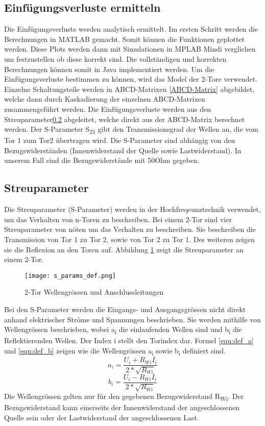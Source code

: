 \subsection{Einfügungsverluste ermitteln} \label{subsec:vorgehen}
Die Einfügungsverluste werden analytisch ermittelt. Im ersten Schritt werden die Berechnungen in MATLAB gemacht. Somit können die Funktionen  geplottet werden. Diese Plots werden dann mit Simulationen in MPLAB Mindi verglichen um festzustellen ob diese korrekt sind. Die vollständigen und korrekten Berechnungen können somit in Java implementiert werden. Um die Einfügungsverluste bestimmen zu können, wird das Model der 2-Tore verwendet. Einzelne Schaltungsteile werden in ABCD-Matrixen \ref{ABCD-Matrix} abgebildet, welche dann durch Kaskadierung der einzelnen ABCD-Matrixen zusammengeführt werden. Die Einfügungsverluste werden aus den Streuparameter\ref{subsec:Streuparameter} abgeleitet, welche direkt aus der ABCD-Matrix berechnet werden.
Der S-Parameter S\textsubscript{21} gibt den Transmissionsgrad der Wellen an, die vom Tor 1 zum Tor2 übertragen wird. Die S-Parameter sind abhängig von den Bezugswiderständen (Innenwiderstand der Quelle sowie Lastwiderstand). In unserem Fall sind die Bezugswiderstände mit 50Ohm gegeben.

\newpage
\subsection{Streuparameter}\label{subsec:Streuparameter}
Die Streuparameter (S-Parameter) werden in der Hochfreqeunztechnik verwendet, um das Verhalten von n-Toren zu beschreiben. Bei einem 2-Tor sind vier Streuparameter von nöten um das Verhalten zu beschreiben. Sie beschreiben die Transmission von Tor 1 zu Tor 2, sowie von Tor 2 zu Tor 1. Des weiteren zeigen sie die Reflexion an den Toren auf. Abbildung \ref{fig:2-Tor}  zeigt die Streuparameter an einem 2-Tor. 
\begin{figure}[H]
	\centering
	\texttt{[image: s\_params\_def.png]}
	\caption{2-Tor Wellengrössen und Anschlussleitungen}
	\label{fig:2-Tor}
\end{figure}
Bei den S-Parameter werden die Eingangs- und Ausgangsgrössen nicht direkt anhand elektrischer Ströme und Spannungen beschrieben. Sie werden mithilfe von Wellengrössen beschrieben, wobei a\textsubscript{i} die einlaufenden Wellen sind und b\textsubscript{i} die Reflektierenden Wellen. Der Index i stellt den Torindex dar. Formel \ref{equ:def_a} und \ref{equ:def_b} zeigen wie die Wellengrössen a\textsubscript{i} sowie b\textsubscript{i} definiert sind.
\begin{equation}\label{equ:def_a}
	a_{ i } = \frac{ U_{ i}+R_{ Wi }I_{ i }}{2*\sqrt{ R_{ Wi } }}
\end{equation}
\begin{equation}\label{equ:def_b}
	b_{ i } = \frac{ U_{ i}-R_{ Wi }I_{ i }}{2*\sqrt{ R_{ Wi } }}
\end{equation}
Die Wellengrössen gelten nur für den gegebenen Bezugswiderstand R\textsubscript{Wi}. Der Bezugswiderstand kann einerseits der Innenwiderstand der angeschlossenen Quelle sein oder der Lastwiderstand der angeschlossenen Last.

